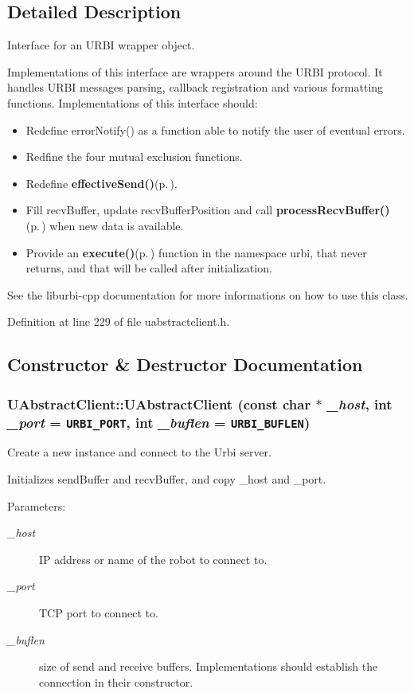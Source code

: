 \subsection{Detailed Description}
Interface for an URBI wrapper object. 

Implementations of this interface are wrappers around the URBI protocol. It handles URBI messages parsing, callback registration and various formatting functions. Implementations of this interface should:\begin{itemize}
\item Redefine error\-Notify() as a function able to notify the user of eventual errors.\item Redfine the four mutual exclusion functions.\item Redefine {\bf effective\-Send()}{\rm (p.\,\pageref{classUAbstractClient_b1})}.\item Fill recv\-Buffer, update recv\-Buffer\-Position and call {\bf process\-Recv\-Buffer()}{\rm (p.\,\pageref{classUAbstractClient_b0})} when new data is available.\item Provide an {\bf execute()}{\rm (p.\,\pageref{namespaceurbi_a5})} function in the namespace urbi, that never returns, and that will be called after initialization.\end{itemize}


See the liburbi-cpp documentation for more informations on how to use this class. 



Definition at line 229 of file uabstractclient.h.

\subsection{Constructor \& Destructor Documentation}
\subsubsection{\setlength{\rightskip}{0pt plus 5cm}UAbstract\-Client::UAbstract\-Client (const char $\ast$ {\em \_\-host}, int {\em \_\-port} = {\tt {\bf URBI\_\-PORT}}, int {\em \_\-buflen} = {\tt {\bf URBI\_\-BUFLEN}})}\label{classUAbstractClient_a0}


Create a new instance and connect to the Urbi server. 

Initializes send\-Buffer and recv\-Buffer, and copy \_\-host and \_\-port. \begin{Desc}
\item[Parameters:]
\begin{description}
\item[{\em \_\-host}]IP address or name of the robot to connect to. \item[{\em \_\-port}]TCP port to connect to. \item[{\em \_\-buflen}]size of send and receive buffers. Implementations should establish the connection in their constructor. \end{description}
\end{Desc}


